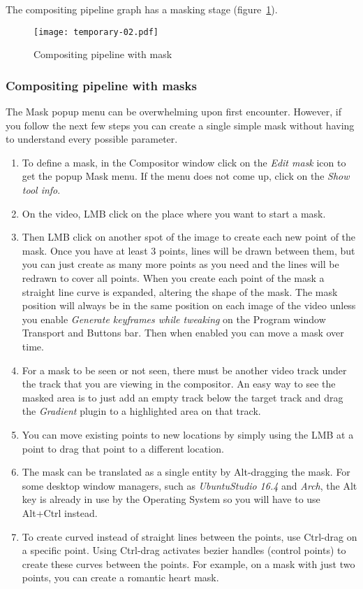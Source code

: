 The compositing pipeline graph has a masking stage (figure~\ref{fig:temporary-02}).

\begin{figure}[htpb]
    \centering
    \texttt{[image: temporary-02.pdf]}
    \caption{Compositing pipeline with mask}
    \label{fig:temporary-02}
\end{figure}

\subsubsection*{Compositing pipeline with masks}%
\label{ssub:compositing_pipeline_with_masks}

The Mask popup menu can be overwhelming upon first encounter.  However, if you follow the next
few steps you can create a single simple mask without having to understand every possible parameter.
\begin{enumerate}
    \item To define a mask, in the Compositor window click on the \textit{Edit mask} icon to get the popup Mask menu.  If the menu does not come up, click on the \textit{Show tool info}.
    \item  On the video, LMB click on the place where you want to start a mask.
    \item  Then LMB click on another spot of the image to create each new point of the mask. Once
you have at least 3 points, lines will be drawn between them, but you can just create as many
more points as you need and the lines will be redrawn to cover all points. When you 
create each point of the mask a straight line curve is expanded, altering the shape of the mask.
The mask position will always be in the same position on each image of the video unless you enable 
\textit{Generate keyframes while tweaking} on the Program window Transport and Buttons bar. Then when 
enabled you can move a mask over time.
     \item For a mask to be seen or not seen, there must be another video track under the track
that you are viewing in the compositor.  An easy way to see the masked area is to just add an empty track
below the target track and drag the \textit{Gradient} plugin to a highlighted area on that track.
     \item  You can move existing points to new locations by simply using the LMB at a point to
drag that point to a different location.
    \item  The mask can be translated as a single entity by Alt-dragging the mask.  For some desktop
window managers, such as \textit{UbuntuStudio 16.4} and \textit{Arch}, the Alt key is already in use
by the Operating System so you will have to use Alt+Ctrl instead.
    \item To create curved instead of straight lines between the points, use  Ctrl-drag on a
specific point. Using Ctrl-drag activates bezier handles (control points) to create these curves
between the points. For example, on a mask with just two points, you can create a romantic heart mask.     
\end{enumerate}

